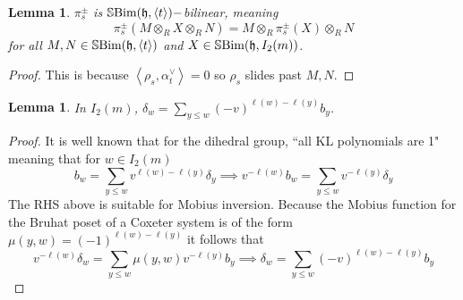 \documentclass[10pt]{article}
\numberwithin{theorem}{section}
\newtheorem{lemma}[theorem]{Lemma}
\theoremstyle{definition}
\newcommand{\hf}{\mathfrak{h}}
\newcommand{\sbim}{\mathbb{S}\textnormal{Bim}}
\newcommand{\abrac}[1]{\left\langle#1\right\rangle}
\newcommand{\0}{\ \raisebox{-2ex}{\begin{tikzpicture}[xscale=0.25,yscale=0.3,thick,baseline]
 \draw (0,0) -- (0,3); 
\end{tikzpicture}}}
\renewcommand{\1}{\ \raisebox{-2ex}{\begin{tikzpicture}[xscale=0.25,yscale=0.3,thick,baseline]
 \draw (0,0) -- (0,1);
 \draw (0,2) -- (0,3);
 \node[dot] at (0,1) {};
  \node[dot] at (0,2) {};
\end{tikzpicture}}}
\begin{document}
\begin{lemma}
\label{lembilinear}
    $\pi^{\pm}_s$ is $\sbim(\hf, \abrac{t} )-$bilinear, meaning
    \[ \pi^\pm_s (M\otimes_R X \otimes_R N)=M\otimes_R\pi^\pm_s(X) \otimes_R N  \]
    for all $M, N\in \sbim(\hf, \abrac{t} )$ and $X\in \sbim(\hf, I_2(m))$.
\end{lemma}
\begin{proof}
    This is because $\abrac{\rho_s, \alpha_t^\vee}=0$ so $\rho_s$ slides past $M, N$. 
\end{proof}





\begin{lemma}
\label{deltabchange}
In $I_2(m)$, $\displaystyle \delta_w=\sum_{y\le w}(-v)^{\ell(w)-\ell(y)}b_y$.
\end{lemma}
\begin{proof}
    It is well known that for the dihedral group, ``all KL polynomials are 1" meaning that for $w\in I_2(m)$
    \[  b_{w}=\sum_{y\le w} v^{\ell(w)-\ell(y) } \delta_y \implies  v^{-\ell(w)}b_{w}=\sum_{y\le w} v^{-\ell(y) } \delta_y  \]
    The RHS above is suitable for Mobius inversion. Because the Mobius function for the Bruhat poset of a Coxeter system is of the form $\mu(y,w)=(-1)^{\ell(w)-\ell(y)}$ \cite{Stem07} it follows that
    \[  v^{-\ell(w)}\delta_w=\sum_{y\le w} \mu(y,w)v^{-\ell(y)}b_y\implies  \delta_w=\sum_{y\le w}(-v)^{\ell(w)-\ell(y)}b_y \]
\end{proof}
\end{document}
